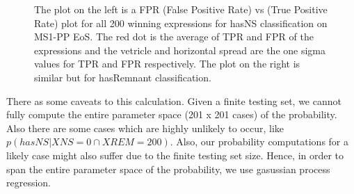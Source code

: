 \begin{figure}[htp]
  \centering
  \quad
  \caption{The plot on the left is a FPR (False Positive Rate) vs (True Positive Rate) plot for all 200 winning expressions for hasNS classification on MS1-PP EoS. The red dot is the average of TPR and FPR of the expressions and the vetricle and horizontal spread are the one sigma values for TPR and FPR respectively. The plot on the right is similar but for hasRemnant classification.  }
  \label{fig:FPR_TPR}
\end{figure}

There as some caveats to this calculation. Given a finite testing set, we cannot fully compute the entire parameter space (201 x 201 cases) of the probability. Also there are some cases which are highly unlikely to occur, like $p(hasNS | XNS=0 \cap XREM=200)$. Also, our probability computations for a likely case might also suffer due to the finite testing set size. Hence, in order to span the entire parameter space of the probability, we use gasussian process regression.   


